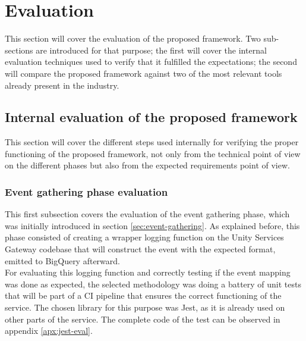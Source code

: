 \documentclass[english, 12pt, a4paper, sci, utf8, a-1b, online]{aaltothesis}
\begin{document}
\section{Evaluation}
\label{sec:evaluation}

This section will cover the evaluation of the proposed framework. Two sub-sections are introduced for that purpose; the first will cover the internal evaluation techniques used to verify that it fulfilled the expectations; the second will compare the proposed framework against two of the most relevant tools already present in the industry.

\subsection{Internal evaluation of the proposed framework}

This section will cover the different steps used internally for verifying the proper functioning of the proposed framework, not only from the technical point of view on the different phases but also from the expected requirements point of view.

\subsubsection{Event gathering phase evaluation}
\label{sec:event-gathering-eval}

This first subsection covers the evaluation of the event gathering phase, which was initially introduced in section \ref{sec:event-gathering}. As explained before, this phase consisted of creating a wrapper logging function on the Unity Services Gateway codebase that will construct the event with the expected format, emitted to BigQuery afterward.\\

For evaluating this logging function and correctly testing if the event mapping was done as expected, the selected methodology was doing a battery of unit tests that will be part of a CI pipeline that ensures the correct functioning of the service. The chosen library for this purpose was Jest, as it is already used on other parts of the service. The complete code of the test can be observed in appendix \ref{apx:jest-eval}.
\end{document}
